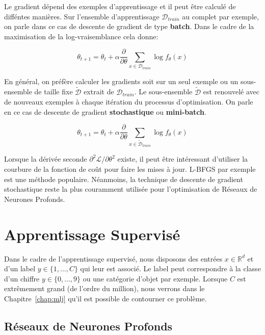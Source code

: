 Le gradient dépend des exemples d'apprentissage et il peut être calculé de
difféntes manières. Sur l'ensemble d'apprentissage $\mathcal{D}_{train}$ au
complet par exemple, on parle dans ce cas de descente de gradient de type
{\bf batch}. Dans le cadre de la maximisation de la log-vraisemblance cela donne:

\begin{equation}
\theta_{t+1} = \theta_{t} + \alpha \dfrac{\partial}{\partial\theta} \sum_{x\in\mathcal{D}_{train}}\log f_{\theta}(x)
\end{equation}

 En général, on préfère calculer les gradients soit sur un seul exemple ou un
 sous-ensemble de taille fixe $\tilde{\mathcal{D}}$ extrait de
 $\mathcal{D}_{train}$. Le sous-ensemble $\tilde{\mathcal{D}}$ est renouvelé
 avec de nouveaux exemples à chaque itération du processus d'optimisation. On
 parle en ce cas de descente de gradient {\bf stochastique} ou {\bf
 mini-batch}.

\begin{equation}
\theta_{t+1} = \theta_{t} + \alpha \dfrac{\partial}{\partial\theta} \sum_{x\in\tilde{\mathcal{D}}_{train}}\log f_{\theta}(x)
\end{equation}

Lorsque la dérivée seconde $\partial^{2}\mathcal{L}/\partial \theta^{2}$
existe, il peut être intéressant d'utiliser la courbure de la fonction de coût
pour faire les mises à jour. L-BFGS \citep{Byrd1995} par exemple est une méthode populaire.
Néanmoins, la technique de descente de gradient stochastique reste la plus
couramment utilisée pour l'optimisation de Réseaux de Neurones Profonds. 

\section{Apprentissage Supervisé \label{sec:supervised}}

Dans le cadre de l'apprentissage supervisé, nous disposons des entrées
$x\in\mathbb{R}^{d}$ et d'un label $y\in\{1,\dots ,C\}$ qui leur est associé.
Le label peut correspondre à la classe d'un chiffre $y\in\{0,\dots ,9\}$ ou une
catégorie d'objet par exemple.  Lorsque $C$ est extrêmement grand (de l'ordre
du million), nous verrons dans le Chapitre~\ref{chap:mlj} qu'il est possible de
contourner ce problème.
 
\subsection{Réseaux de Neurones Profonds}

